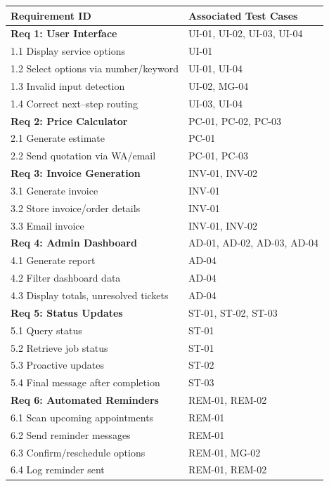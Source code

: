 ﻿\documentclass[11pt, a4paper]{article}
\begin{document}
\renewcommand{\arraystretch}{1.4}
\begin{longtable}{|p{}|p{}|}
    \hline
    \rowcolor{headergray} \textbf{Requirement ID} & \textbf{Associated Test Cases} \\ \hline

    \textbf{Req 1: User Interface} & UI-01, UI-02, UI-03, UI-04 \\ \hline
    1.1 Display service options & UI-01 \\ \hline
    1.2 Select options via number/keyword & UI-01, UI-04 \\ \hline
    1.3 Invalid input detection & UI-02, MG-04 \\ \hline
    1.4 Correct next–step routing & UI-03, UI-04 \\ \hline

    \textbf{Req 2: Price Calculator} & PC-01, PC-02, PC-03 \\ \hline
    2.1 Generate estimate & PC-01 \\ \hline
    2.2 Send quotation via WA/email & PC-01, PC-03 \\ \hline

    \textbf{Req 3: Invoice Generation} & INV-01, INV-02 \\ \hline
    3.1 Generate invoice & INV-01 \\ \hline
    3.2 Store invoice/order details & INV-01 \\ \hline
    3.3 Email invoice & INV-01, INV-02 \\ \hline

    \textbf{Req 4: Admin Dashboard} & AD-01, AD-02, AD-03, AD-04 \\ \hline
    4.1 Generate report & AD-04 \\ \hline
    4.2 Filter dashboard data & AD-04 \\ \hline
    4.3 Display totals, unresolved tickets & AD-04 \\ \hline

    \textbf{Req 5: Status Updates} & ST-01, ST-02, ST-03 \\ \hline
    5.1 Query status & ST-01 \\ \hline
    5.2 Retrieve job status & ST-01 \\ \hline
    5.3 Proactive updates & ST-02 \\ \hline
    5.4 Final message after completion & ST-03 \\ \hline

    \textbf{Req 6: Automated Reminders} & REM-01, REM-02 \\ \hline
    6.1 Scan upcoming appointments & REM-01 \\ \hline
    6.2 Send reminder messages & REM-01 \\ \hline
    6.3 Confirm/reschedule options & REM-01, MG-02 \\ \hline
    6.4 Log reminder sent & REM-01, REM-02 \\ \hline


\end{longtable}
\end{document}
